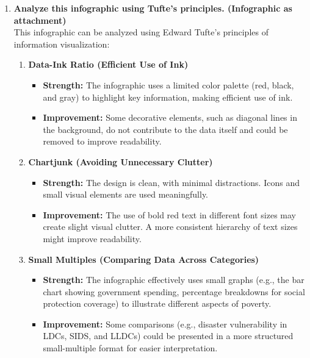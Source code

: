\documentclass[11pt,a4paper,titlepage]{article}
\begin{document}
\begin{enumerate}
\begin{enumerate}
\begin{enumerate}
\begin{enumerate}
\end{enumerate}

    \item \textbf{Analyze this infographic using Tufte's principles. (Infographic as attachment)} \\
    This infographic can be analyzed using Edward Tufte's principles of information visualization:
    \begin{enumerate}
        \item \textbf{Data-Ink Ratio (Efficient Use of Ink)}
        \begin{itemize}
            \item \textbf{Strength:} The infographic uses a limited color palette (red, black, and gray) to highlight key information, making efficient use of ink.
            \item \textbf{Improvement:} Some decorative elements, such as diagonal lines in the background, do not contribute to the data itself and could be removed to improve readability.
        \end{itemize}

        \item \textbf{Chartjunk (Avoiding Unnecessary Clutter)}
        \begin{itemize}
            \item \textbf{Strength:} The design is clean, with minimal distractions. Icons and small visual elements are used meaningfully.
            \item \textbf{Improvement:} The use of bold red text in different font sizes may create slight visual clutter. A more consistent hierarchy of text sizes might improve readability.
        \end{itemize}

        \item \textbf{Small Multiples (Comparing Data Across Categories)}
        \begin{itemize}
            \item \textbf{Strength:} The infographic effectively uses small graphs (e.g., the bar chart showing government spending, percentage breakdowns for social protection coverage) to illustrate different aspects of poverty.
            \item \textbf{Improvement:} Some comparisons (e.g., disaster vulnerability in LDCs, SIDS, and LLDCs) could be presented in a more structured small-multiple format for easier interpretation.
        \end{itemize}


\end{enumerate}
\end{enumerate}
\end{enumerate}
\end{enumerate}
\end{document}
